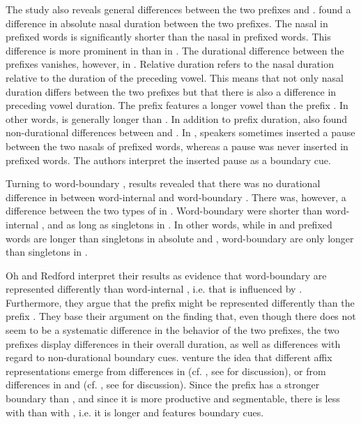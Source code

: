 The study also reveals general differences between the two prefixes  and . \cite{Oh.2012} found a difference in absolute nasal duration between the two prefixes. The nasal in prefixed words is significantly shorter than the nasal in prefixed words. This difference is more prominent in  than in . The durational difference between the prefixes vanishes, however, in . Relative duration refers to the nasal duration relative to the duration of the preceding vowel. This means that not only nasal duration differs between the two prefixes but that there is also a difference in preceding vowel duration. The prefix  features a longer vowel than the prefix .  In other words,  is generally longer than . In addition to prefix duration, \cite{Oh.2012}
also found non-durational differences between  and . In , speakers sometimes inserted a pause between the two nasals of prefixed words, whereas a pause was never inserted in prefixed words. The authors interpret the inserted pause as a boundary cue.

Turning to word-boundary ,  results revealed that there was no durational difference in  between word-internal and word-boundary . There was, however, a difference between the two types of  in . Word-boundary  were shorter than word-internal , and as long as singletons in . In other words, while  in  and prefixed words are longer than singletons in absolute and , word-boundary  are only longer than singletons in .


Oh and Redford interpret their results as evidence that word-boundary  are represented differently than word-internal , i.e. that  is influenced by .  Furthermore, they argue that the prefix  might be represented differently than the prefix . They base their argument on the finding that, even though there does not seem to be a systematic difference in the  behavior of the two prefixes, the two prefixes display differences in their overall duration, as well as differences with regard to non-durational boundary cues. \cite{Oh.2012} venture the idea that different affix representations emerge from differences in  (cf. \citealt{Kiparsky.1982,Mohanan.1986}, see  for discussion), or from differences in  and  (cf. \citealt{Hay.2003}, see  for discussion). Since the prefix  has a stronger boundary than , and since it is more productive and segmentable, there is less  with  than with , i.e. it is longer and features boundary cues.


